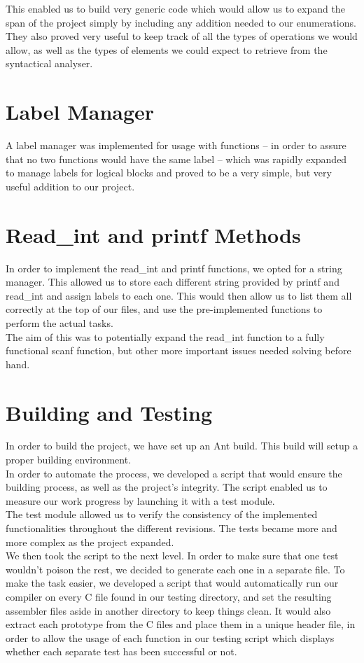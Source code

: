 \documentclass{scrartcl}
\begin{document}
This enabled us to build very generic code which would allow us to expand the span of the project simply by including any addition needed to our enumerations. They also proved very useful to keep track of all the types of operations we would allow, as well as the types of elements we could expect to retrieve from the syntactical analyser.

\section{Label Manager}
A label manager was implemented for usage with functions -- in order to assure that no two functions would have the same label -- which was rapidly expanded to manage labels for logical blocks and proved to be a very simple, but very useful addition to our project.

\section{Read\_int and printf Methods}
In order to implement the read_int and printf functions, we opted for a string manager. This allowed us to store each different string provided by printf and read_int and assign labels to each one. This would then allow us to list them all correctly at the top of our files, and use the pre-implemented functions to perform the actual tasks.\\

The aim of this was to potentially expand the
read_int function to a fully functional scanf function, but other more important issues needed solving before hand.

\section{Building and Testing}
In order to build the project, we have set up an Ant build. This build will setup a proper building environment.\\
In order to automate the process, we developed a script that would ensure the building process, as well as the project's integrity. The script enabled us to measure our work progress by launching it with a test module.\\
The test module allowed us to verify the consistency of the implemented functionalities throughout the different revisions. The tests became more and more complex as the project expanded.\\

We then took the script to the next level. In order to make sure that one test wouldn't poison the rest, we decided to generate each one in a separate file. To make the task easier, we developed a script that would automatically run our compiler on every C file found in our testing directory, and set the resulting assembler files aside in another directory to keep things clean. It would also extract each prototype from the C files and place them in a unique header file, in order to allow the usage of each function in our testing script which displays whether each separate test has been successful or not.
\end{document}
